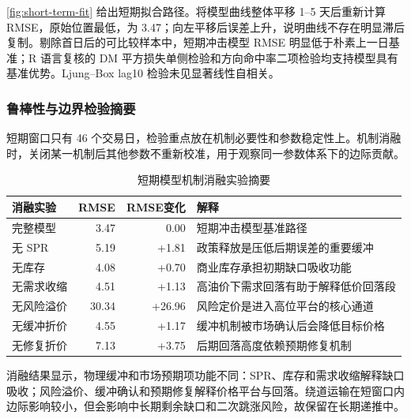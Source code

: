 \cref{fig:short-term-fit} 给出短期拟合路径。将模型曲线整体平移 1--5 天后重新计算 RMSE，原始位置最低，为 3.47；向左平移后误差上升，说明曲线不存在明显滞后复制。剔除首日后的可比较样本中，短期冲击模型 RMSE 明显低于朴素上一日基准；R 语言复核的 DM 平方损失单侧检验和方向命中率二项检验均支持模型具有基准优势。Ljung--Box lag10 检验未见显著线性自相关。

\subsubsection{鲁棒性与边界检验摘要}

短期窗口只有 46 个交易日，检验重点放在机制必要性和参数稳定性上。机制消融时，关闭某一机制后其他参数不重新校准，用于观察同一参数体系下的边际贡献。

\begin{table}[!htbp]
\centering
\caption{短期模型机制消融实验摘要}
\begin{tabularx}{\linewidth}{l r r X}
\toprule
消融实验 & RMSE & RMSE变化 & 解释 \\
\midrule
完整模型 & 3.47 & 0.00 & 短期冲击模型基准路径 \\
无 SPR & 5.19 & +1.81 & 政策释放是压低后期误差的重要缓冲 \\
无库存 & 4.08 & +0.70 & 商业库存承担初期缺口吸收功能 \\
无需求收缩 & 4.51 & +1.13 & 高油价下需求回落有助于解释低价回落段 \\
无风险溢价 & 30.34 & +26.96 & 风险定价是进入高位平台的核心通道 \\
无缓冲折价 & 4.55 & +1.17 & 缓冲机制被市场确认后会降低目标价格 \\
无修复折价 & 7.13 & +3.75 & 后期回落高度依赖预期修复机制 \\
\bottomrule
\end{tabularx}
\end{table}

消融结果显示，物理缓冲和市场预期项功能不同：SPR、库存和需求收缩解释缺口吸收；风险溢价、缓冲确认和预期修复解释价格平台与回落。绕道运输在短窗口内边际影响较小，但会影响中长期剩余缺口和二次跳涨风险，故保留在长期递推中。

